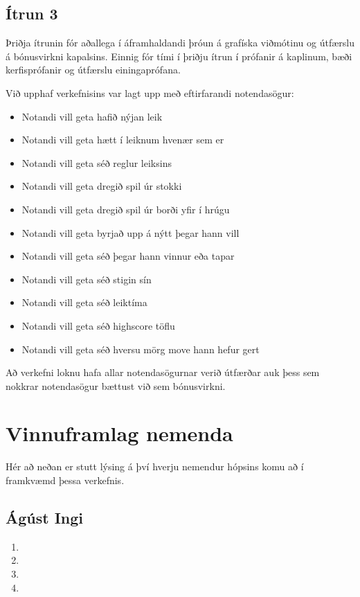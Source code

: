 \documentclass[11pt,a4paper,titlepage]{article}
\theoremstyle{plain}
\theoremstyle{remark}
\begin{document}
\subsection*{Ítrun 3}

Þriðja ítrunin fór aðallega í áframhaldandi þróun á grafíska viðmótinu og útfærslu á bónusvirkni kapalsins. Einnig fór tími í þriðju ítrun í prófanir á kaplinum, bæði kerfisprófanir og útfærslu einingaprófana.

\bigskip

Við upphaf verkefnisins var lagt upp með eftirfarandi notendasögur:

\begin{itemize}
\item Notandi vill geta hafið nýjan leik
\item Notandi vill geta hætt í leiknum hvenær sem er
\item Notandi vill geta séð reglur leiksins
\item Notandi vill geta dregið spil úr stokki
\item Notandi vill geta dregið spil úr borði yfir í hrúgu
\item Notandi vill geta byrjað upp á nýtt þegar hann vill
\item Notandi vill geta séð þegar hann vinnur eða tapar
\item Notandi vill geta séð stigin sín
\item Notandi vill geta séð leiktíma
\item Notandi vill geta séð highscore töflu
\item Notandi vill geta séð hversu mörg move hann hefur gert
\end{itemize}

Að verkefni loknu hafa allar notendasögurnar verið útfærðar auk þess sem nokkrar notendasögur bættust við sem bónusvirkni.

\section{Vinnuframlag nemenda}

Hér að neðan er stutt lýsing á því hverju nemendur hópsins komu að í framkvæmd þessa verkefnis.

\subsection*{Ágúst Ingi}

\begin{enumerate}
\item
\item
\item
\item
\end{enumerate}
\end{document}
